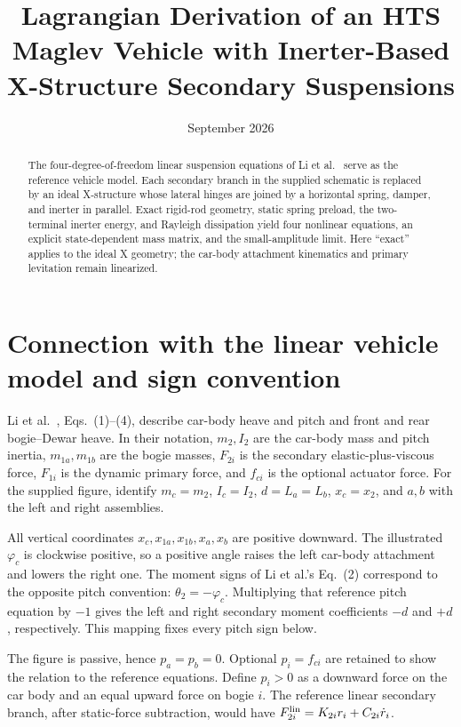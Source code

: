 \documentclass[a4paper,11pt]{article}
\title{Lagrangian Derivation of an HTS Maglev Vehicle with Inerter-Based X-Structure Secondary Suspensions}
\author{}
\date{September 2026}
\numberwithin{equation}{section}
\begin{document}
\maketitle
\begin{abstract}
The four-degree-of-freedom linear suspension equations of Li et al.~\cite{Li2021} serve as the reference vehicle model. Each secondary branch in the supplied schematic is replaced by an ideal X-structure whose lateral hinges are joined by a horizontal spring, damper, and inerter in parallel. Exact rigid-rod geometry, static spring preload, the two-terminal inerter energy, and Rayleigh dissipation yield four nonlinear equations, an explicit state-dependent mass matrix, and the small-amplitude limit. Here ``exact'' applies to the ideal X geometry; the car-body attachment kinematics and primary levitation remain linearized.
\end{abstract}

\section{Connection with the linear vehicle model and sign convention}
Li et al.~\cite{Li2021}, Eqs.~(1)--(4), describe car-body heave and pitch and front and rear bogie--Dewar heave. In their notation, $m_2,I_2$ are the car-body mass and pitch inertia, $m_{1a},m_{1b}$ are the bogie masses, $F_{2i}$ is the secondary elastic-plus-viscous force, $F_{1i}$ is the dynamic primary force, and $f_{ci}$ is the optional actuator force. For the supplied figure, identify $m_c=m_2$, $I_c=I_2$, $d=L_a=L_b$, $x_c=x_2$, and $a,b$ with the left and right assemblies.

All vertical coordinates $x_c,x_{1a},x_{1b},x_a,x_b$ are positive downward. The illustrated $\varphi_c$ is clockwise positive, so a positive angle raises the left car-body attachment and lowers the right one. The moment signs of Li et al.'s Eq.~(2) correspond to the opposite pitch convention: $\theta_2=-\varphi_c$. Multiplying that reference pitch equation by $-1$ gives the left and right secondary moment coefficients $-d$ and $+d$, respectively. This mapping fixes every pitch sign below.

The figure is passive, hence $p_a=p_b=0$. Optional $p_i=f_{ci}$ are retained to show the relation to the reference equations. Define $p_i>0$ as a downward force on the car body and an equal upward force on bogie $i$. The reference linear secondary branch, after static-force subtraction, would have $F_{2i}^{\rm lin}=K_{2i}r_i+C_{2i}\dot r_i$.
\end{document}
